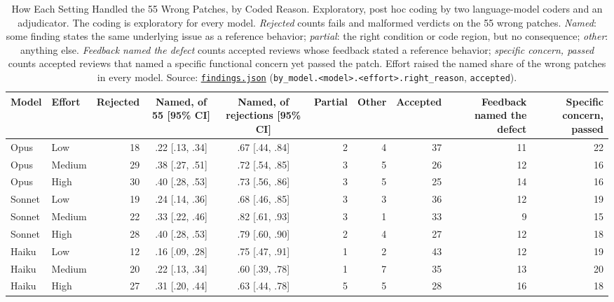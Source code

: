 \documentclass[sigconf,nonacm]{acmart}
\newcommand{\code}[1]{\texttt{#1}}
\begin{document}
\begin{table}[t]
\caption{How Each Setting Handled the 55 Wrong Patches, by Coded Reason. Exploratory, post hoc coding by two language-model coders and an adjudicator. The coding is exploratory for every model. \textit{Rejected} counts fails and malformed verdicts on the 55 wrong patches. \textit{Named}: some finding states the same underlying issue as a reference behavior; \textit{partial}: the right condition or code region, but no consequence; \textit{other}: anything else. \textit{Feedback named the defect} counts accepted reviews whose feedback stated a reference behavior; \textit{specific concern, passed} counts accepted reviews that named a specific functional concern yet passed the patch. Effort raised the named share of the wrong patches in every model. Source: \href{https://github.com/trustmybot/research-artifacts/blob/cr-effort-claude-5.5-v1.1/papers/cr-effort-claude-5.5/findings/artifact/outputs/findings.json}{\code{findings.json}} (\code{by\_model.<model>.<effort>.right\_reason}, \code{accepted}).}\label{tab:rq6}
\footnotesize
\setlength{\tabcolsep}{4pt}
\begin{tabular}{@{}ll r c c r r r r r@{}}
\toprule
Model & Effort & Rejected & Named, of 55 [95\% CI] & Named, of rejections [95\% CI] & Partial & Other & Accepted & Feedback named the defect & Specific concern, passed \\
\midrule
Opus & Low & 18 & .22 [.13, .34] & .67 [.44, .84] & 2 & 4 & 37 & 11 & 22 \\
Opus & Medium & 29 & .38 [.27, .51] & .72 [.54, .85] & 3 & 5 & 26 & 12 & 16 \\
Opus & High & 30 & .40 [.28, .53] & .73 [.56, .86] & 3 & 5 & 25 & 14 & 16 \\
\addlinespace
Sonnet & Low & 19 & .24 [.14, .36] & .68 [.46, .85] & 3 & 3 & 36 & 12 & 19 \\
Sonnet & Medium & 22 & .33 [.22, .46] & .82 [.61, .93] & 3 & 1 & 33 & 9 & 15 \\
Sonnet & High & 28 & .40 [.28, .53] & .79 [.60, .90] & 2 & 4 & 27 & 12 & 18 \\
\addlinespace
Haiku & Low & 12 & .16 [.09, .28] & .75 [.47, .91] & 1 & 2 & 43 & 12 & 19 \\
Haiku & Medium & 20 & .22 [.13, .34] & .60 [.39, .78] & 1 & 7 & 35 & 13 & 20 \\
Haiku & High & 27 & .31 [.20, .44] & .63 [.44, .78] & 5 & 5 & 28 & 16 & 18 \\
\bottomrule
\end{tabular}
\end{table}
\end{document}
